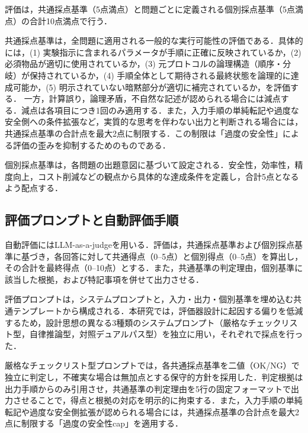 \documentclass[twocolumn]{jarticle}
\begin{document}
評価は，共通採点基準（5点満点）と問題ごとに定義される個別採点基準（5点満点）の合計10点満点で行う．

共通採点基準は，全問題に適用される一般的な実行可能性の評価である．具体的には，(1) 実験指示に含まれるパラメータが手順に正確に反映されているか，(2) 必須物品が適切に使用されているか，(3) 元プロトコルの論理構造（順序・分岐）が保持されているか，(4) 手順全体として期待される最終状態を論理的に達成可能か，(5) 明示されていない暗黙部分が適切に補完されているか，を評価する．
一方，計算誤り，論理矛盾，不自然な記述が認められる場合には減点する．減点は各項目につき1回のみ適用する．また，入力手順の単純転記や過度な安全側への条件拡張など，実質的な思考を伴わない出力と判断される場合には，共通採点基準の合計点を最大2点に制限する．この制限は「過度の安全性」による評価の歪みを抑制するためのものである．

個別採点基準は，各問題の出題意図に基づいて設定される．安全性，効率性，精度向上，コスト削減などの観点から具体的な達成条件を定義し，合計5点となるよう配点する．

\subsection{評価プロンプトと自動評価手順}
自動評価にはLLM-as-a-judgeを用いる．評価は，共通採点基準および個別採点基準に基づき，各回答に対して共通得点（0--5点）と個別得点（0--5点）を算出し，その合計を最終得点（0--10点）とする．また，共通基準の判定理由，個別基準に該当した根拠，および特記事項を併せて出力させる．

評価プロンプトは，システムプロンプトと，入力・出力・個別基準を埋め込む共通テンプレートから構成される．本研究では，評価器設計に起因する偏りを低減するため，設計思想の異なる3種類のシステムプロンプト（厳格なチェックリスト型，自律推論型，対照デュアルパス型）を独立に用い，それぞれで採点を行った．

厳格なチェックリスト型プロンプトでは，各共通採点基準を二値（OK/NG）で独立に判定し，不確実な場合は無加点とする保守的方針を採用した．判定根拠は出力手順からのみ引用させ，共通基準の判定理由を5行の固定フォーマットで出力させることで，得点と根拠の対応を明示的に拘束する．また，入力手順の単純転記や過度な安全側拡張が認められる場合には，共通採点基準の合計点を最大2点に制限する「過度の安全性cap」を適用する．
\end{document}

